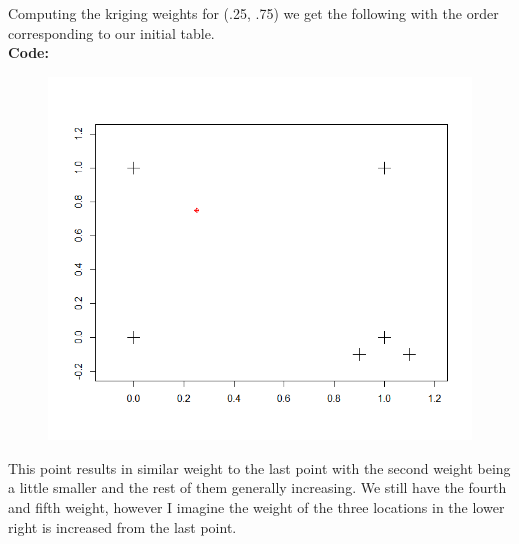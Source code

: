 \documentclass[12pt]{article}
\makeatletter
\theoremstyle{homework}
\newenvironment{exercise}[1]
{\def\@currentlabel{#1}\exercisecore}
{\endexercisecore}
\makeatother
\begin{document}
\begin{exercise}{3}
  Computing the kriging weights for (.25, .75) we get the following with the order corresponding to our initial table. 
  \begin{equation*}
    [0.1750,  0.5820,  0.1810,  0.1130, -0.0969,  0.0462]
  \end{equation*}
  \textbf{Code:}
  \begin{center}
  
  \end{center}
  \begin{figure}[H]
    \begin{center}
    \includegraphics[width = \textwidth]{Rplot07.png}
    \end{center}
  \end{figure}
  This point results in similar weight to the last point with the second weight being a little smaller and the rest of them generally increasing. We still have the fourth and 
  fifth weight, however I imagine the weight of the three locations in the lower right is increased from the last point.\\





\end{exercise}
\end{document}
